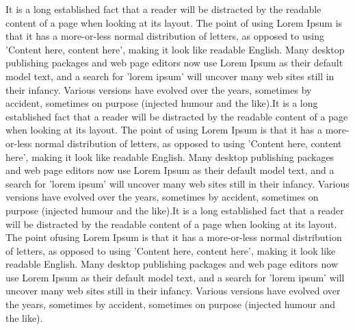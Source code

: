 It is a long established fact that a reader will be distracted by the readable content of a page when looking at its layout. The point of using Lorem Ipsum is that it has a more-or-less normal distribution of letters, as opposed to using 'Content here, content here', making it look like readable English. Many desktop publishing packages and web page editors now use Lorem Ipsum as their default model text, and a search for 'lorem ipsum' will uncover many web sites still in their infancy. Various versions have evolved over the years, sometimes by accident, sometimes on purpose (injected humour and the like).It is a long established fact that a reader will be distracted by the readable content of a page when looking at its layout. The point of using Lorem Ipsum is that it has a more-or-less normal distribution of letters, as opposed to using 'Content here, content here', making it look like readable English. Many desktop publishing packages and web page editors now use Lorem Ipsum as their default model text, and a search for 'lorem ipsum' will uncover many web sites still in their infancy. Various versions have evolved over the years, sometimes by accident, sometimes on purpose (injected humour and the like).It is a long established fact that a reader will be distracted by the readable content of a page when looking at its layout. 
The point ofusing Lorem Ipsum is that it has a more-or-less normal distribution of letters, as opposed to using 'Content here, content here', making it look like readable English. Many desktop publishing packages and web page editors now use Lorem Ipsum as their default model text, and a search for 'lorem ipsum' will uncover many web sites still in their infancy. Various versions have evolved over the years, sometimes by accident, sometimes on purpose (injected humour and the like).

